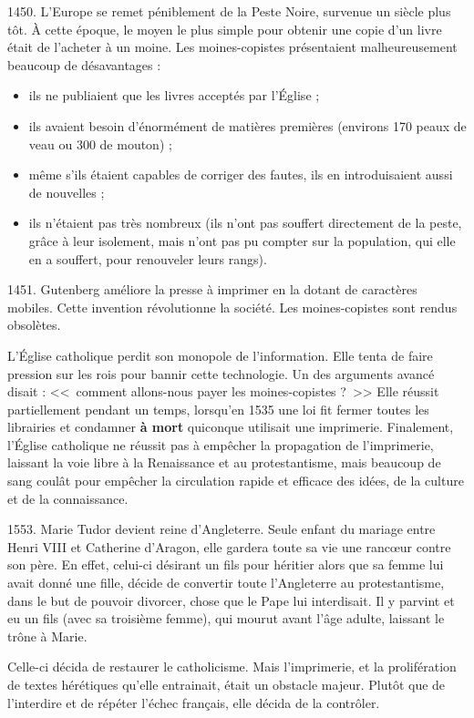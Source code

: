 1450.
L'Europe se remet péniblement de la Peste Noire, survenue un siècle plus tôt.
À cette époque, le moyen le plus simple pour obtenir une copie d'un livre était de l'acheter à un moine.
Les moines-copistes présentaient malheureusement beaucoup de désavantages :

\begin{itemize}
\item ils ne publiaient que les livres acceptés par l'Église ;
\item ils avaient besoin d'énormément de matières premières (environs 170 peaux de veau ou 300 de mouton) ;
\item même s'ils étaient capables de corriger des fautes, ils en introduisaient aussi de nouvelles ;
\item ils n'étaient pas très nombreux (ils n'ont pas souffert directement de la peste, grâce à leur isolement, mais n'ont pas pu compter sur la population, qui elle en a souffert, pour renouveler leurs rangs).
\end{itemize}

1451.
Gutenberg améliore la presse à imprimer en la dotant de caractères mobiles.
Cette invention révolutionne la société.
Les moines-copistes sont rendus obsolètes.

L'Église catholique perdit son monopole de l'information.
Elle tenta de faire pression sur les rois pour bannir cette technologie.
Un des arguments avancé disait : <<~comment allons-nous payer les moines-copistes ?~>>
Elle réussit partiellement pendant un temps, lorsqu'en 1535 une loi fit fermer toutes les librairies et condamner \textbf{à mort} quiconque utilisait une imprimerie.
Finalement, l'Église catholique ne réussit pas à empêcher la propagation de l'imprimerie, laissant la voie libre à la Renaissance et au protestantisme, mais beaucoup de sang coulât pour empêcher la circulation rapide et efficace des idées, de la culture et de la connaissance.

1553.
Marie Tudor devient reine d'Angleterre.
Seule enfant du mariage entre Henri VIII et Catherine d'Aragon, elle gardera toute sa vie une rancœur contre son père.
En effet, celui-ci désirant un fils pour héritier alors que sa femme lui avait donné une fille, décide de convertir toute l'Angleterre au protestantisme, dans le but de pouvoir divorcer, chose que le Pape lui interdisait.
Il y parvint et eu un fils (avec sa troisième femme), qui mourut avant l'âge adulte, laissant le trône à Marie.

Celle-ci décida de restaurer le catholicisme.
Mais l'imprimerie, et la prolifération de textes hérétiques qu'elle entrainait, était un obstacle majeur.
Plutôt que de l'interdire et de répéter l'échec français, elle décida de la contrôler.

